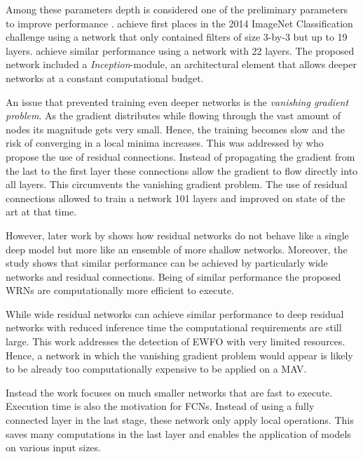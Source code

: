 Among these parameters depth is considered one of the preliminary parameters to improve performance \cite{He}. \citeauthor{Simonyan2014} \cite{Simonyan2014} achieve first places in the 2014 ImageNet Classification challenge using a network that only contained filters of size 3-by-3 but up to 19 layers. \citeauthor{Szegedy2014} \cite{Szegedy2014} achieve similar performance using a network with 22 layers. The proposed network included a \textit{Inception}-module, an architectural element that allows deeper networks at a constant computational budget. 

An issue that prevented training even deeper networks is the \textit{vanishing gradient problem}. As the gradient distributes while flowing through the vast amount of nodes its magnitude gets very small. Hence, the training becomes slow and the risk of converging in a local minima increases. This was addressed by \citeauthor{He2015} \cite{He2015} who propose the use of residual connections. Instead of propagating the gradient from the last to the first layer these connections allow the gradient to flow directly into all layers. This circumvents the vanishing gradient problem. The use of residual connections allowed to train a network 101 layers and improved on state of the art at that time.

However, later work by \citeauthor{Zagoruyko2016} \cite{Zagoruyko2016} shows how residual networks do not behave like a single deep model but more like an ensemble of more shallow networks. Moreover, the study shows that similar performance can be achieved by particularly wide networks and residual connections. Being of similar performance the proposed \acp{WRN} are computationally more efficient to execute.

While wide residual networks can achieve similar performance to deep residual networks with reduced inference time the computational requirements are still large. This work addresses the detection of \ac{EWFO} with very limited resources. Hence, a network in which the vanishing gradient problem would appear is likely to be already too computationally expensive to be applied on a \ac{MAV}.

Instead the work focuses on much smaller networks that are fast to execute. Execution time is also the motivation for \acp{FCN}. Instead of using a fully connected layer in the last stage, these network only apply local operations. This saves many computations in the last layer and enables the application of models on various input sizes.

